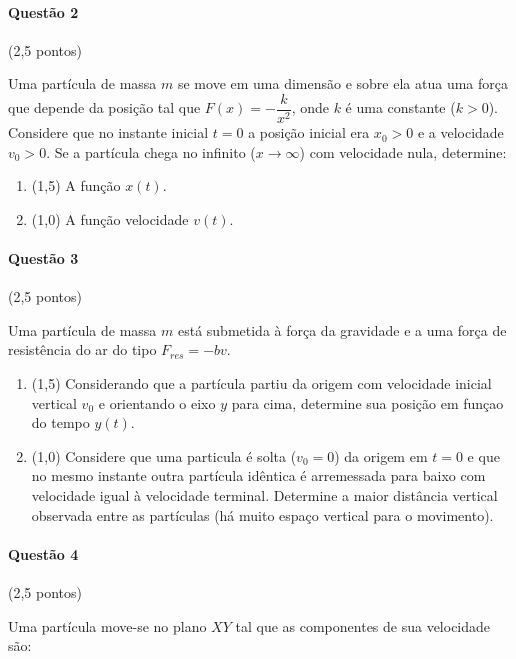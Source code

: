 \documentclass[12pt,a4paper]{article}
\begin{document}
\paragraph{Questão 2} (2,5 pontos)

Uma partícula de massa $m$ se move em uma dimensão e sobre ela atua uma força que depende da posição tal que $F(x)=-\dfrac{k}{x^2}$, onde $k$ é uma constante ($k>0$). Considere que no instante inicial $t=0$ a posição inicial era $x_0>0$ e a velocidade $v_0>0$. Se a partícula chega no infinito ($x\to \infty$) com velocidade nula, determine:

\begin{enumerate}[label=(\alph*)]

\item (1,5) A função $x(t)$.

\item (1,0) A função velocidade $v(t)$.

\end{enumerate}

\paragraph{Questão 3} (2,5 pontos)

Uma partícula de massa $m$ está submetida à força da gravidade e a uma força de resistência do ar do tipo $F_{res}=-bv$.

\begin{enumerate}[label=(\alph*)]

\item (1,5) Considerando que a partícula partiu da origem com velocidade inicial vertical $v_0$ e orientando o eixo $y$ para cima, determine sua posição em funçao do tempo $y(t)$.

\item (1,0) Considere que uma particula é solta ($v_0=0$) da origem em $t=0$ e que no mesmo instante outra partícula idêntica é arremessada para baixo com velocidade igual à velocidade terminal. Determine a maior distância vertical observada entre as partículas (há muito espaço vertical para o movimento).

\end{enumerate}

\paragraph{Questão 4} (2,5 pontos)

Uma partícula move-se no plano $XY$ tal que as componentes de sua velocidade são:
\end{document}
